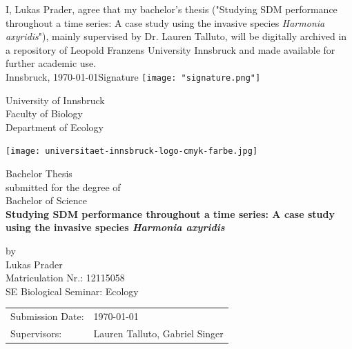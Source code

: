 \documentclass[12pt,a4paper]{article}
\begin{document}
\def\findate{\today}


\thispagestyle{empty}
I, Lukas Prader, agree that my bachelor's thesis ("Studying SDM performance throughout a time series: A case study using the invasive species \textit{Harmonia axyridis}"), mainly supervised by Dr. Lauren Talluto, will be digitally archived in a repository of Leopold Franzens University Innsbruck and made available for further academic use. \\

Innsbruck, \findate					\hfill Signature  \texttt{[image: "signature.png"]}

\newpage
\thispagestyle{empty}
\begin{center}
    \Large{University of Innsbruck \\ Faculty of Biology} \\
    \vspace{3mm}
    \large{Department of Ecology}
    \vspace{10mm}

    \texttt{[image: universitaet-innsbruck-logo-cmyk-farbe.jpg]}

    \vspace{10mm}
    \Large{Bachelor Thesis} \\
    \large{submitted for the degree of} \\
    \Large{Bachelor of Science} \\
    \vspace{10mm}
    \LARGE{\textbf{Studying SDM performance throughout a time series: A case study using the invasive species \textit{Harmonia axyridis}}} \\
    \vspace{10mm}

    \large{by \\ Lukas Prader \\ Matriculation Nr.: 12115058 \\ SE Biological Seminar: Ecology}
\end{center}

\vspace{30mm}
\begin{tabular}{ll}
    \large{Submission Date:} & \large{\findate}                       \\
    \large{Supervisors:}     & \large{Lauren Talluto, Gabriel Singer} \\
\end{tabular}
\end{document}
